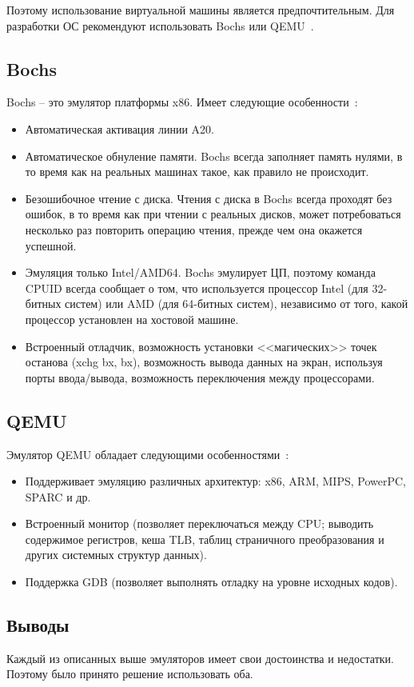 Поэтому использование виртуальной машины является предпочтительным. Для
разработки ОС рекомендуют использовать Bochs или QEMU~\cite{os_dev}.

\subsection{Bochs}
Bochs -- это эмулятор платформы x86. Имеет следующие особенности~\cite{os_dev}:
\begin{itemize}
\item Автоматическая активация линии A20.
\item Автоматическое обнуление памяти. Bochs всегда заполняет память нулями, в то время как
	на реальных машинах такое, как правило не происходит.
\item Безошибочное чтение с диска. Чтения с диска в Bochs всегда проходят без ошибок, в то
	время как при чтении с реальных дисков, может потребоваться несколько раз повторить
	операцию чтения, прежде чем она окажется успешной.
\item Эмуляция только Intel/AMD64. Bochs эмулирует ЦП, поэтому команда CPUID всегда сообщает
	о том, что используется процессор Intel (для 32-битных систем) или AMD (для 64-битных систем),
	независимо от того, какой процессор установлен на хостовой машине.
\item Встроенный отладчик, возможность установки <<магических>> точек останова (xchg bx, bx),
	возможность вывода данных на экран, используя порты ввода/вывода, возможность переключения
	между процессорами.
\end{itemize}

\subsection{QEMU}
Эмулятор QEMU обладает следующими особенностями~\cite{os_dev}:
\begin{itemize}
\item Поддерживает эмуляцию различных архитектур: x86, ARM, MIPS, PowerPC, SPARC и др.
\item Встроенный монитор (позволяет переключаться между CPU; выводить содержимое регистров, кеша TLB,
	таблиц страничного преобразования и других системных структур данных).
\item Поддержка GDB (позволяет выполнять отладку на уровне исходных кодов).
\end{itemize}

\subsection{Выводы}
Каждый из описанных выше эмуляторов имеет свои достоинства и недостатки. Поэтому
было принято решение использовать оба.

